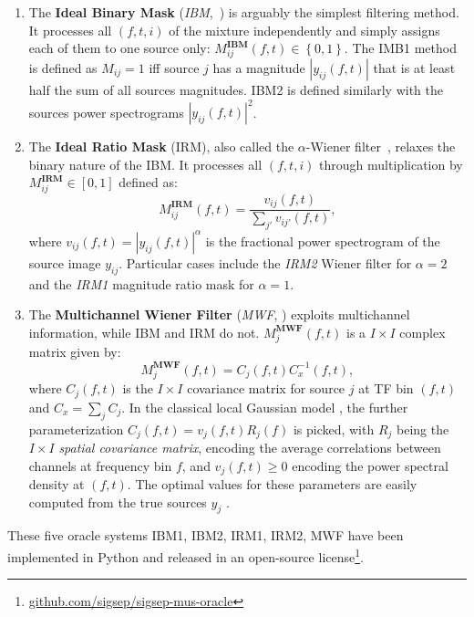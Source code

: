 \documentclass{llncs}
\newcommand{\sboxed}[1]{\textbf{#1}}
\newcommand{\ft}{\left(f,t\right)}
\begin{document}
\begin{enumerate}
  \item The \textbf{Ideal Binary Mask} (\textit{IBM},~\cite{wang2005}) is arguably the simplest filtering method. It processes all $\left(f,t,i\right)$ of the mixture independently and simply assigns each of them to one source only:   $M_{ij}^\sboxed{IBM}\ft\in\left\{0,1\right\}$. The IMB1 method is defined as $M_{ij}=1$ iff source $j$ has a magnitude $\left|y_{ij}(f,t)\right|$ that is at least half the sum of all sources magnitudes. IBM2 is defined similarly with the sources power spectrograms $\left|y_{ij}(f,t)\right|^2$.
  \item The \textbf{Ideal Ratio Mask} (IRM), also called the $\alpha$-Wiener filter~\cite{liutkus15}, relaxes the binary nature of the IBM. It processes all $\left(f,t,i\right)$ through multiplication by $M_{ij}^\sboxed{IRM}\in\left[0,1\right]$ defined as:
  \begin{equation}
    M^{\sboxed{IRM}}_{ij}\ft=\frac{v_{ij}\ft}{\sum_{j'}v_{ij'}\ft},
  \end{equation}
where $v_{ij}\ft=\left|y_{ij}\ft\right|^\alpha$ is the fractional power spectrogram of the source image $y_{ij}$. Particular cases include the \textit{IRM2} Wiener filter for $\alpha=2$ and the \textit{IRM1} magnitude ratio mask for $\alpha=1$.
  \item The \textbf{Multichannel Wiener Filter} (\textit{MWF}, \cite{duong10}) exploits multichannel information, while IBM and IRM do not. $M^{\sboxed{MWF}}_{j}\ft$ is a $I\times I$ complex matrix given by:
  \begin{equation}
    M_{j}^{\sboxed{MWF}}\ft=C_{j}\ft C_{x}^{-1}\ft,
  \end{equation}
where $C_j\ft$ is the $I\times I$ covariance matrix for source $j$ at TF bin $\ft$ and $C_x=\sum_j C_j$. In the classical local Gaussian model \cite{duong10}, the further parameterization $C_j\ft=v_j\ft R_j\left(f\right)$ is picked, with $R_j$ being the $I\times I$ \textit{spatial covariance matrix}, encoding the average correlations between channels at frequency bin $f$, and $v_j\ft\geq0$ encoding the power spectral density at $\ft$. The optimal values for these parameters are easily computed from the true sources $y_j$ \cite{liutkus2013}.
\end{enumerate}

These five oracle systems IBM1, IBM2, IRM1, IRM2, MWF have been implemented in Python and released in an open-source license\footnote{\url{github.com/sigsep/sigsep-mus-oracle}}.
\end{document}
